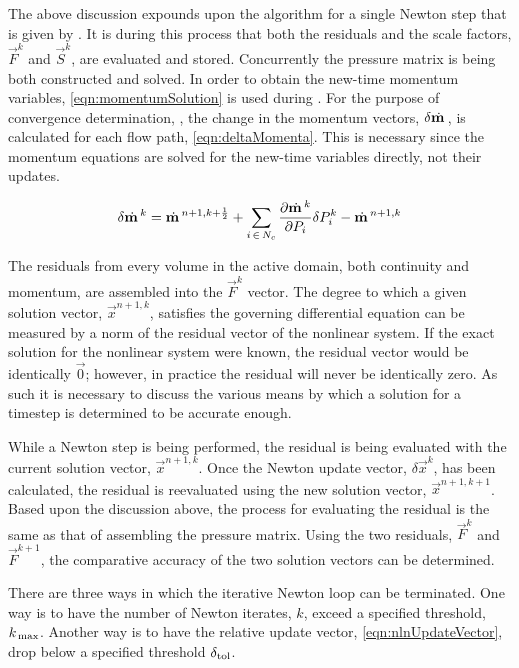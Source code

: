 The above discussion expounds upon the algorithm for a single Newton step that is given by .
It is during this process that both the residuals and the scale factors, $\vec{F}^{k}$ and $\vec{S}^{k}$, are evaluated and stored.
Concurrently the pressure matrix is being both constructed and solved.
In order to obtain the new-time momentum variables, \eqref{eqn:momentumSolution} is used during .
For the purpose of convergence determination, , the change in the momentum vectors, $\delta \momVec{}$, is calculated for each flow path, \eqref{eqn:deltaMomenta}.
This is necessary since the momentum equations are solved for the new-time variables directly, not their updates.

\begin{equation}
\label{eqn:deltaMomenta}
\delta \momVec{}^{k} = \momVec{}^{n+1,k + \onehalf} + \sum_{i \, \in \, N_{c} } \frac{\partial \momVec{}^{k}}{\partial P_{i}} \delta P^{k}_{i} - \momVec{}^{n+1, k}
\end{equation}

The residuals from every volume in the active domain, both continuity and momentum, are assembled into the $\vec{F}^{k}$ vector.
The degree to which a given solution vector, $\vec{x}^{n+1, k}$, satisfies the governing differential equation can be measured by a norm of the residual vector of the nonlinear system.
If the exact solution for the nonlinear system were known, the residual vector would be identically $\vec{0}$; however, in practice the residual will never be identically zero.
As such it is necessary to discuss the various means by which a solution for a timestep is determined to be accurate enough.

While a Newton step is being performed, the residual is being evaluated with the current solution vector, $\vec{x}^{n+1,k}$.
Once the Newton update vector, $\delta \vec{x}^{k}$, has been calculated, the residual is reevaluated using the new solution vector, $\vec{x}^{n+1, k+1}$.
Based upon the discussion above, the process for evaluating the residual is the same as that of assembling the pressure matrix.
Using the two residuals, $\vec{F}^{k}$ and $\vec{F}^{k+1}$, the comparative accuracy of the two solution vectors can be determined.

There are three ways in which the iterative Newton loop can be terminated.
One way is to have the number of Newton iterates, $k$, exceed a specified threshold, $\kmax{}$.
Another way is to have the relative update vector, \eqref{eqn:nlnUpdateVector}, drop below a specified threshold $\dtol{}$.

